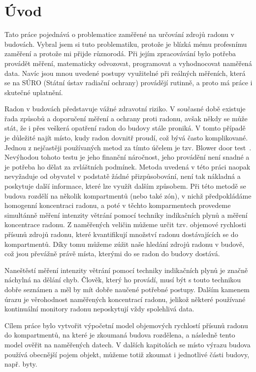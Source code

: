 \chapter{Úvod}
Tato práce pojednává o problematice zaměřené na určování zdrojů radonu v budovách. Vybral jsem si tuto problematiku, protože je blízká mému profesnímu zaměření a protože mi přijde různorodá. Při jejím zpracovávání bylo potřeba provádět měření, matematicky odvozovat, programovat a vyhodnocovat naměřená data. Navíc jsou mnou uvedené postupy využitelné při reálných měřeních, která se na SÚRO (Státní ústav radiační ochrany) provádějí rutinně, a proto má práce i skutečné uplatnění. 

Radon v budovách představuje vážné zdravotní riziko. V současné době existuje řada způsobů a doporučení měření a ochrany proti radonu, avšak někdy se může stát, že i přes veškerá opatření radon do budovy stále proniká. V tomto případě je důležité najít místo, kudy radon dovnitř proudí, což bývá často komplikované. Jednou z nejčastěji používaných metod za tímto účelem je tzv. Blower door test~\cite{wiki_blowerDoorTest}. Nevýhodou tohoto testu je jeho finanční náročnost, jeho provádění není snadné a je potřeba ho dělat za zvláštních podmínek. Metoda uvedená v této práci naopak nevyžaduje od obyvatel v podstatě žádné přizpůsobování, není tak nákladná a poskytuje další informace, které lze využít dalším způsobem. Při této metodě se budova
rozdělí na několik kompartmentů (nebo také zón), v nichž předpokládáme homogenní koncentraci radonu, a poté v těchto komparmentech provedeme simultánně měření intenzity větrání pomocí techniky indikačních plynů a měření koncentrace radonu. Z naměřených veličin můžeme určit tzv. objemové rychlosti přísunů zdrojů radonu, které kvantifikují množství radonu dostávajících se do kompartmentů. Díky tomu můžeme zúžit naše hledání zdrojů radonu v budově, což jsou převážně právě místa, kterými do se radon do budovy dostává.

Naneštěstí měření intenzity větrání pomocí techniky indikačních plynů je značně náchylná na dělání chyb. Člověk, který ho provádí, musí být s touto technikou dobře seznámen a měl by mít dobře naučené potřebné postupy. Dalším kamenem úrazu je věrohodnost naměřených koncentrací radonu, jelikož některé používané kontinuální monitory radonu neposkytují vždy spolehlivá data.

Cílem práce bylo vytvořit výpočetní model objemových rychlostí přísunů radonu do kompartmentů, na které je zkoumaná budova rozdělena, a následně tento model ověřit na naměřených datech. V dalších kapitolách se místo výrazu budova používá obecnější pojem objekt, můžeme totiž zkoumat i jednotlivé části budovy, např. byty.


